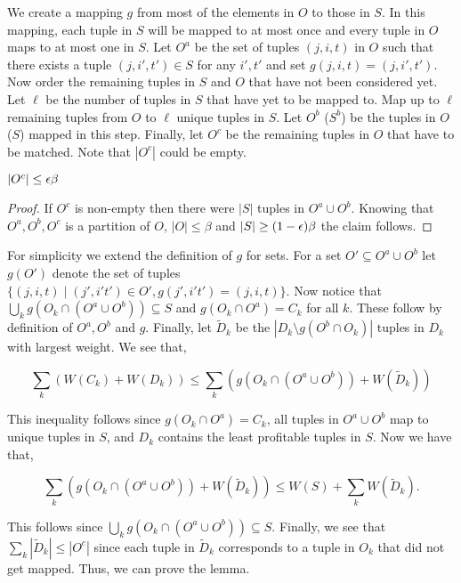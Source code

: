 We create a mapping $g$ from most of the elements in $O$ to those in $S$.  In this mapping, each tuple in $S$ will be mapped to at most once and every tuple in $O$ maps to at most one in $S$.  Let $O^a$ be the set of tuples $(j,i,t)$ in $O$ such that there exists a tuple $(j,i',t') \in S$ for any $i',t'$ and set $g(j,i,t) = (j,i',t')$.   Now order the remaining tuples in $S$ and $O$ that have not been considered yet. Let $\ell$ be the number of tuples in $S$ that have yet to be mapped to.  Map up to $\ell$ remaining tuples from $O$ to $\ell$ unique tuples in $S$.  Let $O^b$ ($S^b$) be the tuples in $O$ ($S$) mapped in this step.  Finally, let $O^c$ be the remaining tuples in $O$ that have to be matched.  Note that $|O^c|$ could be empty.  

\begin{claim}
\label{claim:smallset}
$|O^c| \leq \epsilon \beta$
\end{claim}

\begin{proof}
If $O^c$ is non-empty then there were $|S|$ tuples in $O^a \cup O^b$. Knowing that $O^a, O^b, O^c$ is a partition of $O$, $|O| \leq \beta$ and $|S| \geq (1-\epsilon)\beta$ the claim follows.  
\end{proof}

 For simplicity we extend the definition of $g$ for sets. For a set $O' \subseteq O^a \cup O^b$ let $g(O')$ denote the set of tuples $\{(j,i,t)\; | \; (j',i't') \in O', g(j',i't') =(j,i,t)  \}$.   Now notice that $ \bigcup_k g(O_k \cap(O^a \cup O^b)) \subseteq S $ and $ g(O_k \cap O^a ) = C_k $ for all $k$.  These follow by definition of $O^a, O^b$ and $g$.  Finally, let $\tilde{D}_k$ be the $|D_k \setminus g(O^b \cap O_k)|$  tuples in $D_k$ with largest weight.  We see that,

$$\sum_k(W(C_k) + W(D_k)) \leq \sum_k(g(O_k \cap(O^a \cup O^b)) + W(\tilde{D}_k ))$$

This inequality follows since  $ g(O_k \cap O^a ) = C_k $, all tuples in $O^a \cup O^b$ map to unique tuples in $S$, and $D_k$ contains the least profitable tuples in $S$.  Now we have that,

$$ \sum_k(g(O_k \cap(O^a \cup O^b)) + W(\tilde{D}_k )) \leq  W(S) + \sum_k W(\tilde{D}_k ).$$

This follows since $ \bigcup_k g(O_k \cap(O^a \cup O^b)) \subseteq S $. Finally, we see that $\sum_k |\tilde{D}_k| \leq |O^c|$ since each tuple in $\tilde{D}_k$  corresponds to a tuple in $O_k$ that did not get mapped. Thus, we can prove the lemma.

